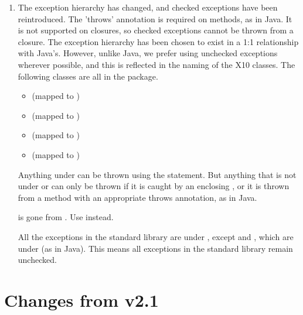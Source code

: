 \begin{enumerate}
\item The exception hierarchy has changed, and checked exceptions have
  been reintroduced.  The 'throws' annotation is required on methods,
  as in Java.  It is not supported on closures, so checked exceptions
  cannot be thrown from a closure.  The exception hierarchy has been
  chosen to exist in a 1:1 relationship with Java's.  However, unlike
  Java, we prefer using unchecked exceptions wherever possible, and
  this is reflected in the naming of the X10 classes.  The following
  classes are all in the  package.
  \begin{itemize}
  \item {} (mapped to ) 
  \item {} (mapped to ) 
  \item {}  (mapped to ) 
  \item {}  (mapped to ) 
  \end{itemize}

  Anything under  can be thrown using the 
  statement. But anything that is not under  or  can
  only be thrown if it is caught by an enclosing , or it is
  thrown from a method with an appropriate throws annotation, as in
  Java.

   is gone from \Xten{}.  Use  instead.

  All the exceptions in the standard library are under ,
  except  and , which are under
   (as in Java).  This means all exceptions in the standard
  library remain unchecked.

\end{enumerate}

\section{Changes from \Xten{} v2.1}

